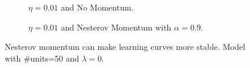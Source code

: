 \documentclass[11pt]{article}
\begin{document}
\begin{figure}[H]
    \centering
    \begin{subfigure}[b]{0.45\textwidth}
        \centering
        \vspace{-0.74cm}
         \caption{$\eta=0.01$ and No Momentum.}
         \label{fig:nm_fix_instability_1}
    \end{subfigure}
    \hfill
    \begin{subfigure}[b]{0.45\textwidth}
        \centering
        \vspace{-0.74cm}
         \caption{$\eta=0.01$ and Nesterov Momentum with $\alpha=0.9$.}
         \label{fig:nm_fix_instability_2}
     \end{subfigure}
        \vspace{-0.16cm}
\caption{Nesterov momentum can make learning curves more stable. Model with \#units=50 and $\lambda=0$.}
\label{fig:nm_fix_instability}
\end{figure}
\end{document}
